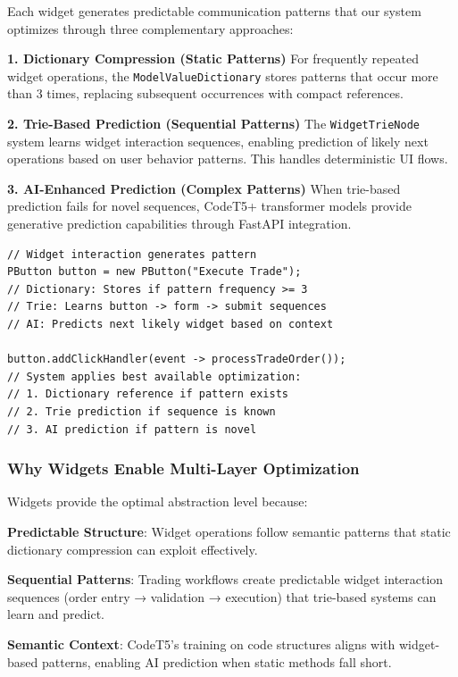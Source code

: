 \documentclass[12pt,a4paper]{article}
\begin{document}
Each widget generates predictable communication patterns that our system optimizes through three complementary approaches:

\textbf{1. Dictionary Compression (Static Patterns)}
For frequently repeated widget operations, the \texttt{ModelValueDictionary} stores patterns that occur more than 3 times, replacing subsequent occurrences with compact references.

\textbf{2. Trie-Based Prediction (Sequential Patterns)}
The \texttt{WidgetTrieNode} system learns widget interaction sequences, enabling prediction of likely next operations based on user behavior patterns. This handles deterministic UI flows.

\textbf{3. AI-Enhanced Prediction (Complex Patterns)}
When trie-based prediction fails for novel sequences, CodeT5+ transformer models provide generative prediction capabilities through FastAPI integration.

\begin{lstlisting}[caption=Widget Pattern Processing Flow]
// Widget interaction generates pattern
PButton button = new PButton("Execute Trade");
// Dictionary: Stores if pattern frequency >= 3
// Trie: Learns button -> form -> submit sequences  
// AI: Predicts next likely widget based on context

button.addClickHandler(event -> processTradeOrder());
// System applies best available optimization:
// 1. Dictionary reference if pattern exists
// 2. Trie prediction if sequence is known
// 3. AI prediction if pattern is novel
\end{lstlisting}

\subsubsection{Why Widgets Enable Multi-Layer Optimization}

Widgets provide the optimal abstraction level because:

\textbf{Predictable Structure}: Widget operations follow semantic patterns that static dictionary compression can exploit effectively.

\textbf{Sequential Patterns}: Trading workflows create predictable widget interaction sequences (order entry → validation → execution) that trie-based systems can learn and predict.

\textbf{Semantic Context}: CodeT5's training on code structures aligns with widget-based patterns, enabling AI prediction when static methods fall short.
\end{document}
